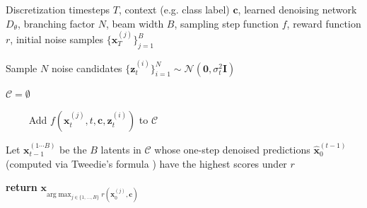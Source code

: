 \documentclass{article}
\newcommand{\x}{\mathbf{x}}
\newcommand{\N}{\mathcal{N}}
\begin{document}
\begin{algorithm}
\caption{Beam Search}
\label{alg:beam}
\begin{algorithmic}[1]
\Require Discretization timesteps $T$, 
         context (e.g. class label) $\mathbf{c}$,
         learned denoising network $D_\theta$,
        branching factor $N$, beam width $B$, sampling step function $f$, reward function $r$, initial noise samples $\{\x_T^{(j)}\}_{j=1}^B$

\vspace{1mm}

    Sample $N$ noise candidates $\{\mathbf{z}_t^{(i)}\}_{i=1}^N \sim \N(\mathbf{0}, \sigma_t^2\mathbf{I})$

    $\mathcal{C} = \emptyset$

    
            $\qquad$ Add $f\left(\x_t^{(j)},t,\mathbf{c},\mathbf{z}_t^{(i)}\right)$ to $\mathcal{C}$

        \EndFor
    \EndFor

    Let $\x_{t-1}^{(1\cdots B)}$ be the $B$ latents in $\mathcal{C}$ whose one-step denoised predictions $\hat{\x}_0^{(t-1)}$ (computed via Tweedie's formula \citep{tweedie}) have the highest scores under $r$

    
\EndFor

\State \textbf{return} $\x_{\text{arg}\max_{j \in \{1,\dots,B\}} r\left(\x_0^{(j)},\mathbf{c}\right)}$
\end{algorithmic}
\end{algorithm}
\end{document}
